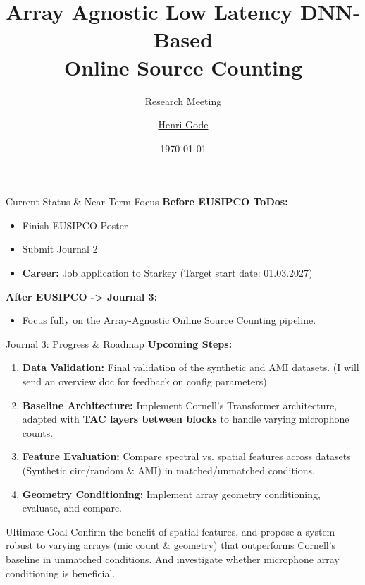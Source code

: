 \documentclass[8pt,hyperref={pdfpagelabels=true},xcolor=table,aspectratio=169]{beamer}
\title{Array Agnostic Low Latency DNN-Based\\ Online Source Counting}
\subtitle{Research Meeting}
\date{\today}
\author[Henri Gode]{\underline{Henri Gode}}
\institute{Signal Processing Group}
\begin{document}
\begin{frame}
    \titlepage
\end{frame}

\begin{frame}{Current Status \& Near-Term Focus}
    \textbf{Before EUSIPCO ToDos:}
    \begin{itemize}
        \item Finish EUSIPCO Poster
        \item Submit Journal 2
        \item \textbf{Career:} Job application to Starkey (Target start date: 01.03.2027)
    \end{itemize}
    \vspace{1.5em}
    \textbf{After EUSIPCO -> Journal 3:}
    \begin{itemize}
        \item Focus fully on the Array-Agnostic Online Source Counting pipeline.
    \end{itemize}
\end{frame}

\begin{frame}{Journal 3: Progress \& Roadmap}
    \textbf{Upcoming Steps:}
    \begin{enumerate}
        \item \textbf{Data Validation:} Final validation of the synthetic and AMI datasets. (I will send an overview doc for feedback on config parameters).
        \item \textbf{Baseline Architecture:} Implement Cornell's Transformer architecture, adapted with \textbf{TAC layers between blocks} to handle varying microphone counts.
        \item \textbf{Feature Evaluation:} Compare spectral vs. spatial features across datasets (Synthetic circ/random \& AMI) in matched/unmatched conditions.
        \item \textbf{Geometry Conditioning:} Implement array geometry conditioning, evaluate, and compare.
    \end{enumerate}
    \vspace{1em}
    \begin{alertblock}{Ultimate Goal}
        Confirm the benefit of spatial features, and propose a system robust to varying arrays (mic count \& geometry) that outperforms Cornell's baseline in unmatched conditions. And investigate whether microphone array conditioning is beneficial.
    \end{alertblock}
\end{frame}
\end{document}
